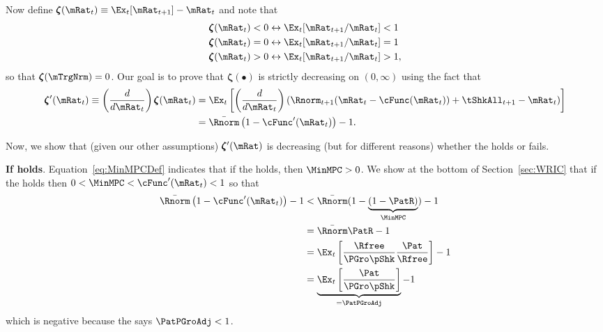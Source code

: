 \documentclass[\econtexRoot/BufferStockTheory]{subfiles}
\begin{document}
Now define \providecommand{\difFunc}{\pmb{\zeta}} $\difFunc(\mRat_t) \equiv 
\Ex_t[\mRat_{t+1}] - \mRat_t$ and note that
\begin{align}\label{eq:difRatioEquiv}
  \difFunc(\mRat_t) < 0 &\leftrightarrow \Ex_t[{\mRat}_{t+1}/\mRat_t] < 1 
                          \nonumber\\
  \difFunc(\mRat_t) = 0 &\leftrightarrow \Ex_t[{\mRat}_{t+1}/\mRat_t] = 1\\
  \difFunc(\mRat_t) > 0 &\leftrightarrow \Ex_t[{\mRat}_{t+1}/\mRat_t] > 
                          1,\nonumber
\end{align}
so that $\difFunc(\mTrgNrm)=0$. Our goal is to prove that $\difFunc(\bullet)$ is strictly 
decreasing on $(0,\infty)$ using the fact that
\begin{align}
  \difFunc^{\prime}(\mRat_{t}) \equiv  \left( \frac{d}{d\mRat_{t}}\right) \difFunc(\mRat_t)  & = \Ex_{t}\left[
                                                                                               \left( \frac{d}{d\mRat_{t}}\right) \left( 
                                                                                               {\Rnorm}_{t+1}(\mRat_{t}-\cFunc(\mRat_{t}))+%
                                                                                               {\tShkAll}_{t+1} - {\mRat}_t\right) \right] \label{eq:difFuncmRatDecreases} \\
                                                                                             & = \bar{\Rnorm}\left(1-\cFunc^{\prime}({\mRat}_t)\right) - 1.  \notag
\end{align}

Now, we show that (given our other assumptions) $\difFunc^{\prime}(\mRat)$ is decreasing (but for different reasons) whether the {\RIC} holds or fails.

\textbf{If {\RIC} holds}. Equation~\eqref{eq:MinMPCDef} indicates that if the {\RIC} holds, then $\MinMPC >0$.  We show at the bottom of Section~\ref{sec:WRIC} that if the {\RIC} holds then $0 < \MinMPC < \cFunc^{\prime}(\mRat_{t}) < 1$ so that 
\begin{align*}
  \bar{\Rnorm}\left(1-\cFunc^{\prime}({\mRat}_t)\right) - 1 & <  \bar{\Rnorm}(1-\underbrace{(1-\PatR)}_{\MinMPC}) - 1  \\
                                                            & = \bar{\Rnorm}\PatR - 1 \\
                                                            & = \Ex_{t}\left[\frac{\Rfree}{\PGro \pShk}\frac{\Pat}{\Rfree}\right] - 1 \\
                                                            & = \underbrace{\Ex_{t}\left[\frac{\Pat}{\PGro \pShk}\right]}_{= \PatPGroAdj} - 1 
\end{align*}
which is negative because the {\GICNrm} says $\PatPGroAdj < 1$.  
\end{document}
